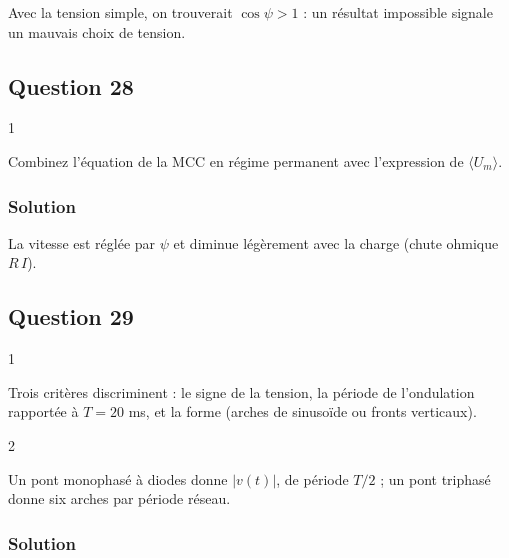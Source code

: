 \documentclass[11pt,a4paper]{article}
\newcommand{\equationajustee}[1]{%
  \sbox{\boiteequation}{$\displaystyle #1$}%
  \ifdim\wd\boiteequation>\linewidth
    \[\resizebox{\linewidth}{!}{\usebox{\boiteequation}}\]%
  \else
    \[#1\]%
  \fi}
\begin{document}
\begin{piege}

Avec la tension simple, on trouverait \(\cos\psi>1\) : un résultat impossible signale un mauvais choix de tension.

\end{piege}

\hypertarget{question-28}{%
\subsection{Question 28}\label{question-28}}

\begin{indication}{1}

Combinez l'équation de la MCC en régime permanent avec l'expression de \(\langle U_m\rangle\).

\end{indication}

\hypertarget{solution-27}{%
\subsubsection{Solution}\label{solution-27}}

\equationajustee{\boxed{N_{m\text{-rp}}=\frac{30}{\pi\,k}\left(\frac3\pi\,U_{\max}\cos\psi-R\,I\right)}.}

La vitesse est réglée par \(\psi\) et diminue légèrement avec la charge (chute ohmique \(R\,I\)).

\hypertarget{question-29}{%
\subsection{Question 29}\label{question-29}}

\begin{indication}{1}

Trois critères discriminent : le signe de la tension, la période de l'ondulation rapportée à \(T=20\) ms, et la forme (arches de sinusoïde ou fronts verticaux).

\end{indication}

\begin{indication}{2}

Un pont monophasé à diodes donne \(|v(t)|\), de période \(T/2\) ; un pont triphasé donne six arches par période réseau.

\end{indication}

\hypertarget{solution-28}{%
\subsubsection{Solution}\label{solution-28}}
\end{document}
